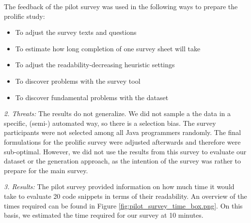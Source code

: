 \documentclass[%
class=scrreprt,
chapterprefix=false,%
open=right,%
twoside=false,%
paper=a4,%
logofile={Logo\_zentral\_farbig\_EN.png},%
thesistype=master,%
UKenglish,%
]{se2thesis}
\theoremstyle{definition}
\begin{document}
	The feedback of the pilot survey was used in the following ways to prepare the prolific study:
	\begin{itemize}
		\item To adjust the survey texts and questions
		\item To estimate how long completion of one survey sheet will take
		\item To adjust the readability-decreasing heuristic settings
		\item To discover problems with the survey tool
		\item To discover fundamental problems with the dataset
	\end{itemize}
	
	\textit{2. Threats:}
	The results do not generalize. We did not sample a the data in a specific, (semi-) automated way, so there is a selection bias. The survey participants were not selected among all Java programmers randomly. The final formulations for the prolific survey were adjusted afterwards and therefore were sub-optimal.
	However, we did not use the results from this survey to evaluate our dataset or the generation approach, as the intention of the survey was rather to prepare for the main survey. 
	
	\textit{3. Results:}
	The pilot survey provided information on how much time it would take to evaluate 20 code snippets in terms of their readability. An overview of the times required can be found in Figure \ref{fig:pilot_survey_time_box.png}. On this basis, we estimated the time required for our survey at 10 minutes.
	
\end{document}

